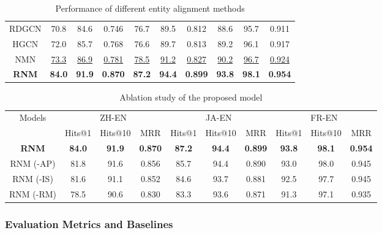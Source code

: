 \documentclass[letterpaper]{article} %
\begin{document}
\begin{table}[]
\begin{tabular}{c|ccc|ccc|ccc}
RDGCN    \cite{wu2019relation}               & 70.8        & 84.6    & 0.746     & 76.7        & 89.5        & 0.812     & 88.6    & 95.7    & 0.911    \\
HGCN      \cite{wu2019jointly}               & 72.0        & 85.7    & 0.768      & 76.6        & 89.7        & 0.813     & 89.2    & 96.1    & 0.917    \\
NMN       \cite{wu2020neighborhood}                & \underline{73.3}        & \underline{86.9}     & \underline{0.781}     & \underline{78.5}        & \underline{91.2}        & \underline{0.827}     & \underline{90.2}    & \underline{96.7}    & \underline{0.924}    \\
\hline  \hline
\bf{RNM}                & \bf84.0        & \bf91.9   & \bf0.870        & \bf87.2       & \bf94.4     & \bf0.899         & \bf93.8        & \bf98.1   & \bf0.954     \\
\hline
\end{tabular}
\caption{Performance of different entity alignment methods}
\label{ent_align}
\end{table}

\begin{table}[]
\centering \small
\begin{tabular}{c|ccc|ccc|ccc}
\hline
\multirow{2}{*}{Models}    & \multicolumn{3}{|c|}{ZH-EN} & \multicolumn{3}{|c|}{JA-EN}  & \multicolumn{3}{|c}{FR-EN} \\
\cline{2-10}
 & Hits@1    &  Hits@10    & MRR     & Hits@1    &  Hits@10    & MRR    & Hits@1    &  Hits@10    & MRR  \\
\hline
\bf{RNM}                & \bf84.0        & \bf91.9   & \bf0.870        & \bf87.2       & \bf94.4     & \bf0.899         & \bf93.8        & \bf98.1   & \bf0.954     \\
\hline
RNM (-AP)              & 81.8        & 91.6    & 0.856     & 85.7        & 94.4        & 0.890     & 93.0    & 98.0    & 0.945    \\
RNM (-IS)               & 81.6        & 91.1    & 0.852     & 84.6        & 93.7        & 0.881     & 92.5    & 97.7    & 0.945    \\
RNM (-RM)              & 78.5        & 90.6    & 0.830     & 83.3        & 93.6        & 0.871     & 91.3    & 97.1    & 0.935    \\
\hline
\end{tabular}
\caption{Ablation study of the proposed model} \label{ablation}
\end{table}


\subsubsection{Evaluation Metrics and Baselines}
\end{document}

